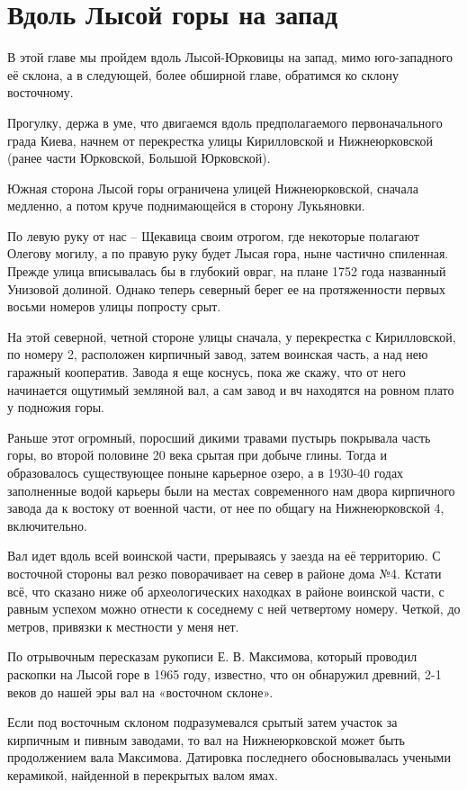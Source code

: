 \chapter{Вдоль Лысой горы на запад}

В этой главе мы пройдем вдоль Лысой-Юрковицы на запад, мимо юго-западного её склона, а в следующей, более обширной главе, обратимся ко склону восточному.

Прогулку, держа в уме, что двигаемся вдоль предполагаемого первоначального града Киева, начнем от перекрестка улицы Кирилловской и Нижнеюрковской (ранее части Юрковской, Большой Юрковской).

Южная сторона Лысой горы ограничена улицей Нижнеюрковской, сначала медленно, а потом круче поднимающейся в сторону Лукьяновки.

По левую руку от нас – Щекавица своим отрогом, где некоторые полагают Олегову могилу, а по правую руку будет Лысая гора, ныне частично спиленная. Прежде улица вписывалась бы в глубокий овраг, на плане 1752 года названный Унизовой долиной. Однако теперь северный берег ее на протяженности первых восьми номеров улицы попросту срыт.

На этой северной, четной стороне улицы сначала, у перекрестка с Кирилловской, по номеру 2, расположен кирпичный завод, затем  воинская часть, а над нею гаражный кооператив. Завода я еще коснусь, пока же скажу, что от него начинается ощутимый земляной вал, а сам завод и вч находятся на ровном плато у подножия горы.

Раньше этот огромный, поросший дикими травами пустырь покрывала часть горы, во второй половине 20 века срытая при добыче глины. Тогда и образовалось существующее поныне карьерное озеро, а в 1930-40 годах заполненные водой карьеры были на местах современного нам двора кирпичного завода да к востоку от военной части, от нее по общагу на Нижнеюрковской 4, включительно.

Вал идет вдоль всей воинской части, прерываясь у заезда на её территорию. С восточной стороны вал резко поворачивает на север в районе дома №4. Кстати всё, что сказано ниже об археологических находках в районе воинской части, с равным успехом можно отнести к соседнему с ней четвертому номеру. Четкой, до метров, привязки к местности у меня нет.

По отрывочным пересказам рукописи Е. В. Максимова, который проводил раскопки на Лысой горе в 1965 году, известно, что он обнаружил древний, 2-1 веков до нашей эры вал на «восточном склоне».

Если под восточным склоном подразумевался срытый затем участок за кирпичным и пивным заводами, то вал на Нижнеюрковской может быть продолжением вала Максимова. Датировка последнего обосновывалась учеными керамикой, найденной в перекрытых валом ямах.


